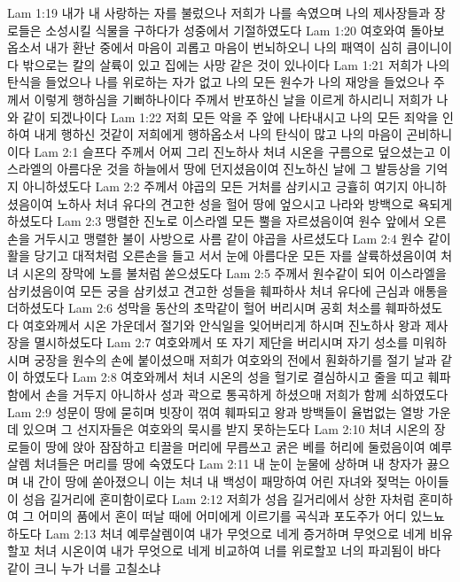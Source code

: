 Lam 1:19  내가 내 사랑하는 자를 불렀으나 저희가 나를 속였으며 나의 제사장들과 장로들은 소성시킬 식물을 구하다가 성중에서 기절하였도다
Lam 1:20  여호와여 돌아보옵소서 내가 환난 중에서 마음이 괴롭고 마음이 번뇌하오니 나의 패역이 심히 큼이니이다 밖으로는 칼의 살륙이 있고 집에는 사망 같은 것이 있나이다
Lam 1:21  저희가 나의 탄식을 들었으나 나를 위로하는 자가 없고 나의 모든 원수가 나의 재앙을 들었으나 주께서 이렇게 행하심을 기뻐하나이다 주께서 반포하신 날을 이르게 하시리니 저희가 나와 같이 되겠나이다
Lam 1:22  저희 모든 악을 주 앞에 나타내시고 나의 모든 죄악을 인하여 내게 행하신 것같이 저희에게 행하옵소서 나의 탄식이 많고 나의 마음이 곤비하니이다
Lam 2:1  슬프다 주께서 어찌 그리 진노하사 처녀 시온을 구름으로 덮으셨는고 이스라엘의 아름다운 것을 하늘에서 땅에 던지셨음이여 진노하신 날에 그 발등상을 기억지 아니하셨도다
Lam 2:2  주께서 야곱의 모든 거처를 삼키시고 긍휼히 여기지 아니하셨음이여 노하사 처녀 유다의 견고한 성을 헐어 땅에 엎으시고 나라와 방백으로 욕되게 하셨도다
Lam 2:3  맹렬한 진노로 이스라엘 모든 뿔을 자르셨음이여 원수 앞에서 오른손을 거두시고 맹렬한 불이 사방으로 사름 같이 야곱을 사르셨도다
Lam 2:4  원수 같이 활을 당기고 대적처럼 오른손을 들고 서서 눈에 아름다운 모든 자를 살륙하셨음이여 처녀 시온의 장막에 노를 불처럼 쏟으셨도다
Lam 2:5  주께서 원수같이 되어 이스라엘을 삼키셨음이여 모든 궁을 삼키셨고 견고한 성들을 훼파하사 처녀 유다에 근심과 애통을 더하셨도다
Lam 2:6  성막을 동산의 초막같이 헐어 버리시며 공회 처소를 훼파하셨도다 여호와께서 시온 가운데서 절기와 안식일을 잊어버리게 하시며 진노하사 왕과 제사장을 멸시하셨도다
Lam 2:7  여호와께서 또 자기 제단을 버리시며 자기 성소를 미워하시며 궁장을 원수의 손에 붙이셨으매 저희가 여호와의 전에서 훤화하기를 절기 날과 같이 하였도다
Lam 2:8  여호와께서 처녀 시온의 성을 헐기로 결심하시고 줄을 띠고 훼파함에서 손을 거두지 아니하사 성과 곽으로 통곡하게 하셨으매 저희가 함께 쇠하였도다
Lam 2:9  성문이 땅에 묻히며 빗장이 꺾여 훼파되고 왕과 방백들이 율법없는 열방 가운데 있으며 그 선지자들은 여호와의 묵시를 받지 못하는도다
Lam 2:10  처녀 시온의 장로들이 땅에 앉아 잠잠하고 티끌을 머리에 무릅쓰고 굵은 베를 허리에 둘렀음이여 예루살렘 처녀들은 머리를 땅에 숙였도다
Lam 2:11  내 눈이 눈물에 상하며 내 창자가 끓으며 내 간이 땅에 쏟아졌으니 이는 처녀 내 백성이 패망하여 어린 자녀와 젖먹는 아이들이 성읍 길거리에 혼미함이로다
Lam 2:12  저희가 성읍 길거리에서 상한 자처럼 혼미하여 그 어미의 품에서 혼이 떠날 때에 어미에게 이르기를 곡식과 포도주가 어디 있느뇨하도다
Lam 2:13  처녀 예루살렘이여 내가 무엇으로 네게 증거하며 무엇으로 네게 비유할꼬 처녀 시온이여 내가 무엇으로 네게 비교하여 너를 위로할꼬 너의 파괴됨이 바다 같이 크니 누가 너를 고칠소냐

